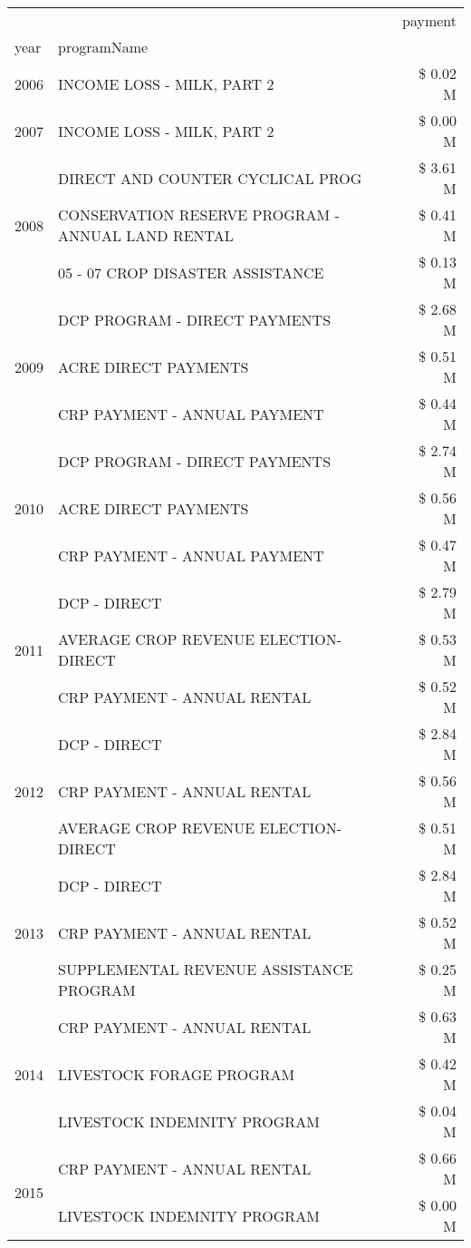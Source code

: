 \begin{tabular}{llr}
\toprule
 &  & payment \\
year & programName &  \\
\midrule
2006 & INCOME LOSS - MILK, PART 2 & \$ 0.02 M \\
\cline{1-3}
2007 & INCOME LOSS - MILK, PART 2 & \$ 0.00 M \\
\cline{1-3}
\multirow[t]{3}{*}{2008} & DIRECT AND COUNTER CYCLICAL PROG & \$ 3.61 M \\
 & CONSERVATION RESERVE PROGRAM - ANNUAL LAND RENTAL & \$ 0.41 M \\
 & 05 - 07 CROP DISASTER ASSISTANCE & \$ 0.13 M \\
\cline{1-3}
\multirow[t]{3}{*}{2009} & DCP PROGRAM - DIRECT PAYMENTS & \$ 2.68 M \\
 & ACRE DIRECT PAYMENTS & \$ 0.51 M \\
 & CRP PAYMENT - ANNUAL PAYMENT & \$ 0.44 M \\
\cline{1-3}
\multirow[t]{3}{*}{2010} & DCP PROGRAM - DIRECT PAYMENTS & \$ 2.74 M \\
 & ACRE DIRECT PAYMENTS & \$ 0.56 M \\
 & CRP PAYMENT - ANNUAL PAYMENT & \$ 0.47 M \\
\cline{1-3}
\multirow[t]{3}{*}{2011} & DCP - DIRECT & \$ 2.79 M \\
 & AVERAGE CROP REVENUE ELECTION-DIRECT & \$ 0.53 M \\
 & CRP PAYMENT - ANNUAL RENTAL & \$ 0.52 M \\
\cline{1-3}
\multirow[t]{3}{*}{2012} & DCP - DIRECT & \$ 2.84 M \\
 & CRP PAYMENT - ANNUAL RENTAL & \$ 0.56 M \\
 & AVERAGE CROP REVENUE ELECTION-DIRECT & \$ 0.51 M \\
\cline{1-3}
\multirow[t]{3}{*}{2013} & DCP - DIRECT & \$ 2.84 M \\
 & CRP PAYMENT - ANNUAL RENTAL & \$ 0.52 M \\
 & SUPPLEMENTAL REVENUE ASSISTANCE PROGRAM & \$ 0.25 M \\
\cline{1-3}
\multirow[t]{3}{*}{2014} & CRP PAYMENT - ANNUAL RENTAL & \$ 0.63 M \\
 & LIVESTOCK FORAGE PROGRAM & \$ 0.42 M \\
 & LIVESTOCK INDEMNITY PROGRAM & \$ 0.04 M \\
\cline{1-3}
\multirow[t]{3}{*}{2015} & CRP PAYMENT - ANNUAL RENTAL & \$ 0.66 M \\
 & LIVESTOCK INDEMNITY PROGRAM & \$ 0.00 M \\

\end{tabular}
